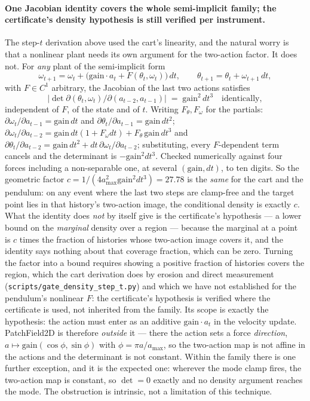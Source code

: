 \documentclass[11pt]{article}
\theoremstyle{definition}
\theoremstyle{remark}
\begin{document}
\paragraph{One Jacobian identity covers the whole semi-implicit family; the certificate's density hypothesis is still verified per instrument.} The step-$t$ derivation above used the cart's linearity, and the natural worry is that a nonlinear plant needs its own argument for the two-action factor. It does not. For \emph{any} plant of the semi-implicit form
\[
  \omega_{t+1} = \omega_t + \big(\mathrm{gain}\cdot a_t + F(\theta_t, \omega_t)\big)\,dt, \qquad
  \theta_{t+1} = \theta_t + \omega_{t+1}\,dt,
\]
with $F \in C^1$ arbitrary, the Jacobian of the last two actions satisfies
\[
  \bigl|\det \partial(\theta_t, \omega_t)/\partial(a_{t-2}, a_{t-1})\bigr| \;=\; \mathrm{gain}^2\, dt^3 \quad\text{identically},
\]
independent of $F$, of the state and of $t$. Writing $F_\theta, F_\omega$ for the partials: $\partial\omega_{t}/\partial a_{t-1} = \mathrm{gain}\,dt$ and $\partial\theta_t/\partial a_{t-1} = \mathrm{gain}\,dt^2$; $\partial\omega_t/\partial a_{t-2} = \mathrm{gain}\,dt(1 + F_\omega dt) + F_\theta\,\mathrm{gain}\,dt^3$ and $\partial\theta_t/\partial a_{t-2} = \mathrm{gain}\,dt^2 + dt\,\partial\omega_t/\partial a_{t-2}$; substituting, every $F$-dependent term cancels and the determinant is $-\mathrm{gain}^2 dt^3$. Checked numerically against four forces including a non-separable one, at several $(\mathrm{gain}, dt)$, to ten digits. So the geometric factor $c = 1/(4a_{\max}^2\mathrm{gain}^2 dt^3) = 27.78$ is the \emph{same} for the cart and the pendulum: on any event where the last two steps are clamp-free and the target point lies in that history's two-action image, the conditional density is exactly $c$. What the identity does \emph{not} by itself give is the certificate's hypothesis --- a lower bound on the \emph{marginal} density over a region --- because the marginal at a point is $c$ times the fraction of histories whose two-action image covers it, and the identity says nothing about that coverage fraction, which can be zero. Turning the factor into a bound requires showing a positive fraction of histories covers the region, which the cart derivation does by erosion and direct measurement (\texttt{scripts/\allowbreak gate\_\allowbreak density\_\allowbreak step\_\allowbreak t.py}) and which we have not established for the pendulum's nonlinear $F$: the certificate's hypothesis is verified where the certificate is used, not inherited from the family. Its scope is exactly the hypothesis: the action must enter as an additive $\mathrm{gain}\cdot a_t$ in the velocity update. PatchField2D is therefore \emph{outside} it --- there the action sets a force \emph{direction}, $a \mapsto \mathrm{gain}(\cos\phi,\sin\phi)$ with $\phi = \pi a/a_{\max}$, so the two-action map is not affine in the actions and the determinant is not constant. Within the family there is one further exception, and it is the expected one: wherever the mode clamp fires, the two-action map is constant, so $\det = 0$ exactly and no density argument reaches the mode. The obstruction is intrinsic, not a limitation of this technique.
\end{document}
